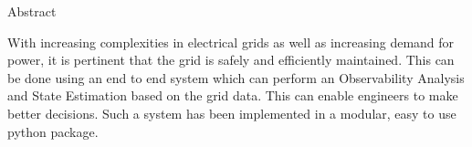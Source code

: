 \begin{center}
\LARGE{Abstract}
\end{center}

\vspace{0.5in}

With increasing complexities in electrical grids as well as increasing demand for power, it is pertinent that the grid is safely and efficiently maintained. This can be done using an end to end system which can perform an Observability Analysis and State Estimation based on the grid data. This can enable engineers to make better decisions. Such a system has been implemented in a modular, easy to use python package. 

